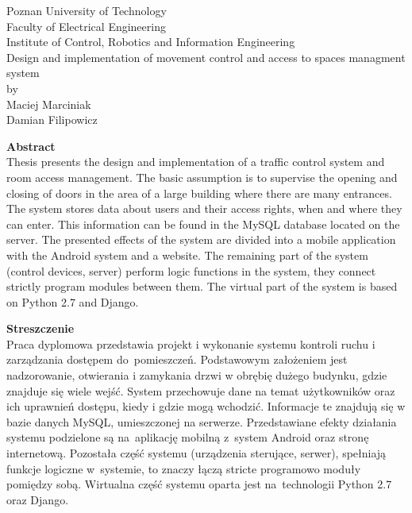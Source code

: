 \documentclass[twoside,10pt]{article}
\def\TytulAngielski {Design and implementation of movement control and access to spaces managment system }
\def\StudentA     {Maciej Marciniak}
\def\StudentB     {Damian Filipowicz}
\begin{document}
\newpage
\thispagestyle{empty}
\begin{center}
Poznan University of Technology\\
Faculty of Electrical Engineering\\
Institute of Control, Robotics and Information Engineering\\
\vspace{20mm}
\huge{\TytulAngielski} \\
\Large{by}\\
\vspace{5mm}
\Large{\StudentA}\\
\Large{\StudentB}\\
\vspace{20mm}

\normalsize\textbf{Abstract} \\
{Thesis presents the design and implementation of a traffic control system and room access management. \linebreak The basic assumption is to supervise the opening and closing of doors in the area of a large building where there are many entrances. The system stores data about users and their access rights, when and where they can enter. This information can be found in the MySQL database located on the server. The presented effects of the system are divided into a mobile application with the Android system and a website. The remaining part of the system (control devices, server) perform logic functions in the system, they connect strictly program modules between them. The virtual part of the system is based on Python 2.7 and Django.} 

\end{center}

\begin{center}
\textbf{Streszczenie} \\
{Praca dyplomowa przedstawia projekt i wykonanie systemu kontroli ruchu i zarządzania dostępem do~pomieszczeń. Podstawowym założeniem jest nadzorowanie, otwierania i zamykania drzwi w obrębię dużego budynku, gdzie znajduje się wiele wejść. System przechowuje dane na temat użytkowników oraz ich uprawnień dostępu, kiedy i gdzie mogą wchodzić. Informacje te znajdują się w bazie danych MySQL, umieszczonej na serwerze. Przedstawiane efekty działania systemu podzielone są na~aplikację mobilną z~system Android oraz stronę internetową. Pozostała część systemu (urządzenia sterujące, serwer), spełniają funkcje logiczne w~systemie, to znaczy łączą stricte programowo moduły pomiędzy sobą. Wirtualna część systemu oparta jest na~technologii Python 2.7 oraz Django.} 
\end{center}
\end{document}
